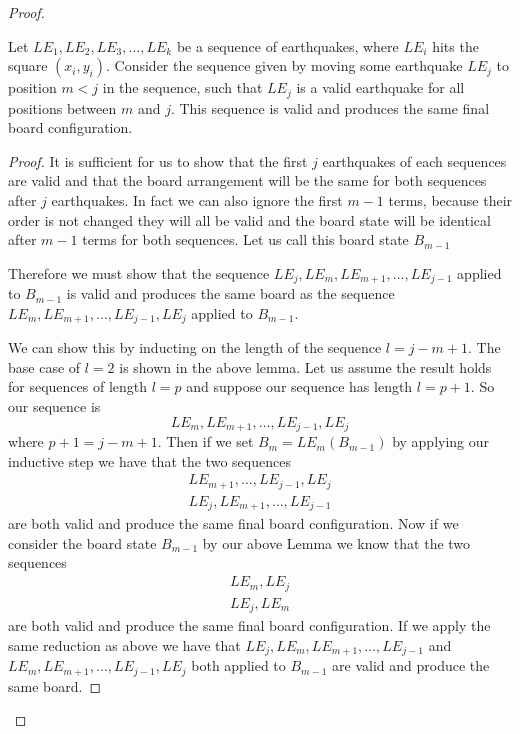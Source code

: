 \documentclass[runningheads,a4paper]{llncs}
\begin{document}
\begin{proof}
\begin{lemma}
Let $LE_1,LE_2,LE_3,\dots, LE_k$ be a sequence of earthquakes, where $LE_i$ hits the square $(x_i, y_i)$. Consider  the sequence given by moving some earthquake $LE_j$ to position $m<j$ in the sequence, such that $LE_j$ is a valid earthquake for all positions between $m$ and $j$. 
This sequence is valid and produces the same final board configuration.
\end{lemma}
\begin{proof}
It is sufficient for us to show that the first $j$ earthquakes of each sequences are valid and that the board arrangement will be the same for both sequences after $j$ earthquakes. In fact we can also ignore the first $m-1$ terms, because their order is not changed they will all be valid and the board state will be identical after $m-1$ terms for both sequences. Let us call this board state $B_{m-1}$

Therefore we must show that the sequence $LE_j, LE_m, LE_{m+1}, \ldots, LE_{j-1}$ applied to $B_{m-1}$ is valid and produces the same board as the sequence $LE_m, LE_{m+1}, \ldots, LE_{j-1}, LE_j$ applied to $B_{m-1}$. 

We can show this by inducting on the length of the sequence $l=j-m+1$. The base case of $l=2$ is shown in the above lemma. Let us assume the result holds for sequences of length $l=p$ and suppose our sequence has length $l=p+1$. So our sequence is 
\begin{equation*}
LE_m, LE_{m+1}, \ldots, LE_{j-1}, LE_j
\end{equation*}
where $p+1=j-m+1$. Then if we set $B_{m} = LE_{m} (B_{m-1})$ by applying our inductive step we have that the two sequences 
\begin{align*}
LE_{m+1}, \ldots, LE_{j-1}, LE_{j} \\ 
LE_{j}, LE_{m+1}, \ldots,  LE_{j-1} 
\end{align*}
are both valid and produce the same final board configuration. Now if we consider the board state $B_{m-1}$ by our above Lemma we know that the two sequences 
\begin{align*}
LE_{m}, LE_{j} \\
LE_{j}, LE_{m}
\end{align*}
are both valid and produce the same final board configuration. If we apply the same reduction as above  we have  that $LE_j, LE_m, LE_{m+1}, \ldots, LE_{j-1}$  and $LE_m, LE_{m+1}, \ldots, LE_{j-1}, LE_j$ both applied to $B_{m-1}$ are valid and produce the same board. 
\end{proof}


\end{proof}
\end{document}
